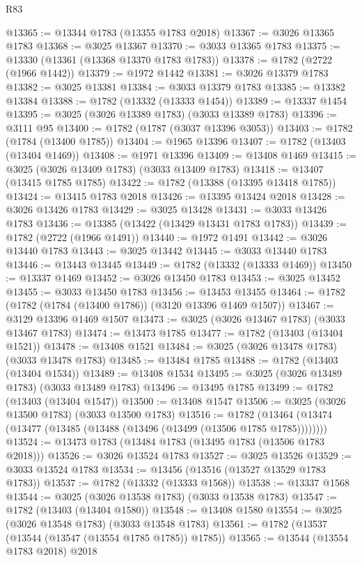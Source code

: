 \begin{lexlean}{R83}
\begin{coremodule}
@13365 := @13344 @1783 (@13355 @1783 @2018)
@13367 := @3026 @13365 @1783
@13368 := @3025 @13367
@13370 := @3033 @13365 @1783
@13375 := @13330 (@13361 (@13368 @13370 @1783 @1783))
@13378 := @1782 (@2722 (@1966 @1442))
@13379 := @1972 @1442
@13381 := @3026 @13379 @1783
@13382 := @3025 @13381
@13384 := @3033 @13379 @1783
@13385 := @13382 @13384
@13388 := @1782 (@13332 (@13333 @1454))
@13389 := @13337 @1454
@13395 := @3025 (@3026 @13389 @1783) (@3033 @13389 @1783)
@13396 := @3111 @95
@13400 := @1782 (@1787 (@3037 @13396 @3053))
@13403 := @1782 (@1784 (@13400 @1785))
@13404 := @1965 @13396
@13407 := @1782 (@13403 (@13404 @1469))
@13408 := @1971 @13396
@13409 := @13408 @1469
@13415 := @3025 (@3026 @13409 @1783) (@3033 @13409 @1783)
@13418 := @13407 (@13415 @1785 @1785)
@13422 := @1782 (@13388 (@13395 @13418 @1785))
@13424 := @13415 @1783 @2018
@13426 := @13395 @13424 @2018
@13428 := @3026 @13426 @1783
@13429 := @3025 @13428
@13431 := @3033 @13426 @1783
@13436 := @13385 (@13422 (@13429 @13431 @1783 @1783))
@13439 := @1782 (@2722 (@1966 @1491))
@13440 := @1972 @1491
@13442 := @3026 @13440 @1783
@13443 := @3025 @13442
@13445 := @3033 @13440 @1783
@13446 := @13443 @13445
@13449 := @1782 (@13332 (@13333 @1469))
@13450 := @13337 @1469
@13452 := @3026 @13450 @1783
@13453 := @3025 @13452
@13455 := @3033 @13450 @1783
@13456 := @13453 @13455
@13464 := @1782 (@1782 (@1784 (@13400 @1786)) (@3120 @13396 @1469 @1507))
@13467 := @3129 @13396 @1469 @1507
@13473 := @3025 (@3026 @13467 @1783) (@3033 @13467 @1783)
@13474 := @13473 @1785
@13477 := @1782 (@13403 (@13404 @1521))
@13478 := @13408 @1521
@13484 := @3025 (@3026 @13478 @1783) (@3033 @13478 @1783)
@13485 := @13484 @1785
@13488 := @1782 (@13403 (@13404 @1534))
@13489 := @13408 @1534
@13495 := @3025 (@3026 @13489 @1783) (@3033 @13489 @1783)
@13496 := @13495 @1785
@13499 := @1782 (@13403 (@13404 @1547))
@13500 := @13408 @1547
@13506 := @3025 (@3026 @13500 @1783) (@3033 @13500 @1783)
@13516 := @1782 (@13464 (@13474 (@13477 (@13485 (@13488 (@13496 (@13499 (@13506 @1785 @1785))))))))
@13524 := @13473 @1783 (@13484 @1783 (@13495 @1783 (@13506 @1783 @2018)))
@13526 := @3026 @13524 @1783
@13527 := @3025 @13526
@13529 := @3033 @13524 @1783
@13534 := @13456 (@13516 (@13527 @13529 @1783 @1783))
@13537 := @1782 (@13332 (@13333 @1568))
@13538 := @13337 @1568
@13544 := @3025 (@3026 @13538 @1783) (@3033 @13538 @1783)
@13547 := @1782 (@13403 (@13404 @1580))
@13548 := @13408 @1580
@13554 := @3025 (@3026 @13548 @1783) (@3033 @13548 @1783)
@13561 := @1782 (@13537 (@13544 (@13547 (@13554 @1785 @1785)) @1785))
@13565 := @13544 (@13554 @1783 @2018) @2018

\end{coremodule}
\end{lexlean}
